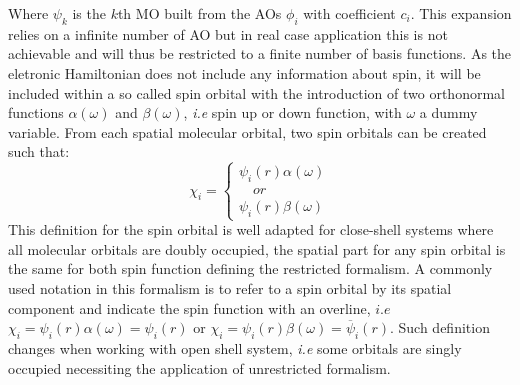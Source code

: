 \documentclass[10pt]{report}
\numberwithin{equation}{section}
\begin{document}
Where $\psi_k$ is the $k$th MO built from the AOs $\phi_i$ with coefficient $c_i$. 
This expansion relies on a infinite number of AO but in real case application this is not achievable and will thus be restricted to a finite number of basis functions.
As the eletronic Hamiltonian does not include any information about spin, it will be included within a so called spin orbital with the introduction of two orthonormal functions $\alpha(\omega)$ and $\beta(\omega)$, \textit{i.e} spin up or down function, with $\omega$ a dummy variable.
From each spatial molecular orbital, two spin orbitals can be created such that:
\begin{equation}
    \chi_i=\begin{cases}
    \psi_i(r)\alpha(\omega)\\
    \quad or \\
    \psi_i(r)\beta(\omega)
    \end{cases}
\end{equation}
This definition for the spin orbital is well adapted for close-shell systems where all molecular orbitals are doubly occupied, the spatial part for any spin orbital is the same for both spin function defining the restricted formalism.
A commonly used notation in this formalism is to refer to a spin orbital by its spatial component and indicate the spin function with an overline, $i.e$ $\chi_i=\psi_i(r)\alpha(\omega)=\psi_i(r)$ or $\chi_i=\psi_i(r)\beta(\omega)=\overline{\psi}_i(r)$.
Such definition changes when working with open shell system, \textit{i.e} some orbitals are singly occupied necessiting the application of unrestricted formalism.
\end{document}
